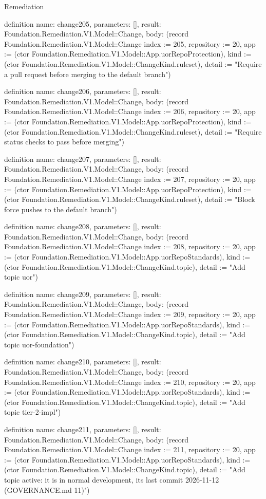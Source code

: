 \begin{lexlean}{Remediation}
\begin{semanticmodule}
definition{
  name: change205,
  parameters: [],
  result: Foundation.Remediation.V1.Model::Change,
  body: (record Foundation.Remediation.V1.Model::Change {index := 205, repository := 20, app := (ctor Foundation.Remediation.V1.Model::App.uorRepoProtection), kind := (ctor Foundation.Remediation.V1.Model::ChangeKind.ruleset), detail := "Require a pull request before merging to the default branch"})
}

definition{
  name: change206,
  parameters: [],
  result: Foundation.Remediation.V1.Model::Change,
  body: (record Foundation.Remediation.V1.Model::Change {index := 206, repository := 20, app := (ctor Foundation.Remediation.V1.Model::App.uorRepoProtection), kind := (ctor Foundation.Remediation.V1.Model::ChangeKind.ruleset), detail := "Require status checks to pass before merging"})
}

definition{
  name: change207,
  parameters: [],
  result: Foundation.Remediation.V1.Model::Change,
  body: (record Foundation.Remediation.V1.Model::Change {index := 207, repository := 20, app := (ctor Foundation.Remediation.V1.Model::App.uorRepoProtection), kind := (ctor Foundation.Remediation.V1.Model::ChangeKind.ruleset), detail := "Block force pushes to the default branch"})
}

definition{
  name: change208,
  parameters: [],
  result: Foundation.Remediation.V1.Model::Change,
  body: (record Foundation.Remediation.V1.Model::Change {index := 208, repository := 20, app := (ctor Foundation.Remediation.V1.Model::App.uorRepoStandards), kind := (ctor Foundation.Remediation.V1.Model::ChangeKind.topic), detail := "Add topic uor"})
}

definition{
  name: change209,
  parameters: [],
  result: Foundation.Remediation.V1.Model::Change,
  body: (record Foundation.Remediation.V1.Model::Change {index := 209, repository := 20, app := (ctor Foundation.Remediation.V1.Model::App.uorRepoStandards), kind := (ctor Foundation.Remediation.V1.Model::ChangeKind.topic), detail := "Add topic uor-foundation"})
}

definition{
  name: change210,
  parameters: [],
  result: Foundation.Remediation.V1.Model::Change,
  body: (record Foundation.Remediation.V1.Model::Change {index := 210, repository := 20, app := (ctor Foundation.Remediation.V1.Model::App.uorRepoStandards), kind := (ctor Foundation.Remediation.V1.Model::ChangeKind.topic), detail := "Add topic tier-2-impl"})
}

definition{
  name: change211,
  parameters: [],
  result: Foundation.Remediation.V1.Model::Change,
  body: (record Foundation.Remediation.V1.Model::Change {index := 211, repository := 20, app := (ctor Foundation.Remediation.V1.Model::App.uorRepoStandards), kind := (ctor Foundation.Remediation.V1.Model::ChangeKind.topic), detail := "Add topic active: it is in normal development, its last commit 2026-11-12 (GOVERNANCE.md 11)"})
}


\end{semanticmodule}
\end{lexlean}
